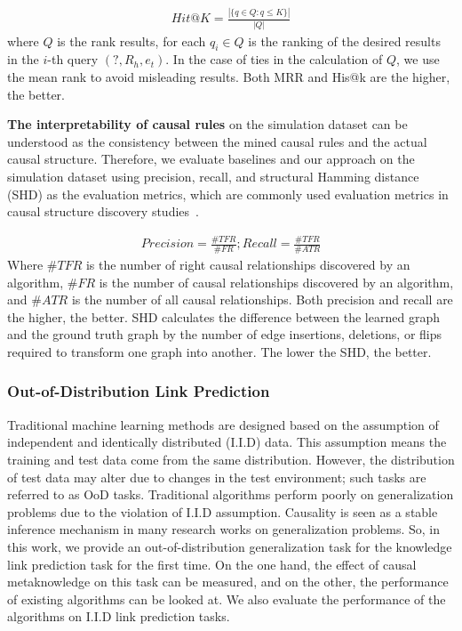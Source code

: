 \begin{equation}
\label{eq:hitk}
\begin{aligned}
Hit@K=\frac{|\{q \in Q: q \leq K\}|}{|Q|}
\end{aligned}
\end{equation}
where $Q$ is the rank results, for each $q_i \in Q$ is the ranking of the desired results in the $i$-th query $(?,R_h,e_t)$.
In the case of ties in the calculation of $Q$, we use the mean rank to avoid misleading results\cite{rossi2021knowledge,ruffinelli2020you}.
Both MRR and His@k are the higher, the better.

\noindent
\textbf{The interpretability of causal rules} on the simulation dataset can be understood as the consistency between the mined causal rules and the actual causal structure.
Therefore, we evaluate baselines and our approach on the simulation dataset using precision, recall, and structural Hamming distance (SHD) as the evaluation metrics, which are commonly used evaluation metrics in causal structure discovery studies~\cite{zheng2018dags,zheng2020learning}.

\begin{equation}
\label{eq:precision}
\begin{aligned}
Precision=\frac{\# TFR}{\#FR};Recall=\frac{\# TFR}{\#ATR}
\end{aligned}
\end{equation}
Where $\#TFR$ is the number of right causal relationships discovered by an algorithm, $\#FR$ is the number of causal relationships discovered by an algorithm, and $\#ATR$ is the number of all causal relationships.
Both precision and recall are the higher, the better.
SHD calculates the difference between the learned graph and the ground truth graph by the number of edge insertions, deletions, or flips required to transform one graph into another.
The lower the SHD, the better.

\subsubsection{\textbf{Out-of-Distribution Link Prediction}}
Traditional machine learning methods are designed based on the assumption of independent and identically distributed (I.I.D) data.
This assumption means the training and test data come from the same distribution. However, the distribution of test data may alter due to changes in the test environment; such tasks are referred to as OoD tasks.
Traditional algorithms perform poorly on generalization problems due to the violation of I.I.D assumption.
Causality is seen as a stable inference mechanism in many research works on generalization problems.
So, in this work, we provide an out-of-distribution generalization task for the knowledge link prediction task for the first time.
On the one hand, the effect of causal metaknowledge on this task can be measured, and on the other, the performance of existing algorithms can be looked at.
We also evaluate the performance of the algorithms on I.I.D link prediction tasks.

